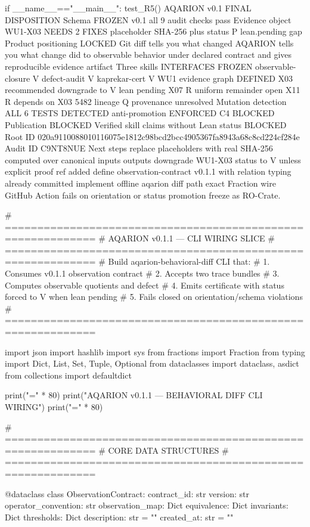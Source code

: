 if __name__=="__main__":
    test_R5()
AQARION v0.1 FINAL DISPOSITION
Schema FROZEN v0.1 all 9 audit checks pass
Evidence object WU1-X03 NEEDS 2 FIXES placeholder SHA-256 plus status P lean.pending gap
Product positioning LOCKED Git diff tells you what changed AQARION tells you what change did to observable behavior under declared contract and gives reproducible evidence artifact
Three skills INTERFACES FROZEN observable-closure V defect-audit V kaprekar-cert V
WU1 evidence graph DEFINED X03 recommended downgrade to V lean pending X07 R uniform remainder open X11 R depends on X03 5482 lineage Q provenance unresolved
Mutation detection ALL 6 TESTS DETECTED anti-promotion ENFORCED
C4 BLOCKED Publication BLOCKED Verified skill claims without Lean status BLOCKED
Root ID 020a9110088010116075e1812c98bcd2bcc4905367fa8943a68c8cd224cf284e Audit ID C9NT8NUE
Next steps replace placeholders with real SHA-256 computed over canonical inputs outputs downgrade WU1-X03 status to V unless explicit proof ref added define observation-contract v0.1.1 with relation typing already committed implement offline aqarion diff path exact Fraction wire GitHub Action fails on orientation or status promotion freeze as RO-Crate.

# ============================================================
# AQARION v0.1.1 — CLI WIRING SLICE
# ============================================================
# Build aqarion-behavioral-diff CLI that:
# 1. Consumes v0.1.1 observation contract
# 2. Accepts two trace bundles
# 3. Computes observable quotients and defect
# 4. Emits certificate with status forced to V when lean pending
# 5. Fails closed on orientation/schema violations
# ============================================================

import json
import hashlib
import sys
from fractions import Fraction
from typing import Dict, List, Set, Tuple, Optional
from dataclasses import dataclass, asdict
from collections import defaultdict

print("=" * 80)
print("AQARION v0.1.1 — BEHAVIORAL DIFF CLI WIRING")
print("=" * 80)

# ============================================================
# CORE DATA STRUCTURES
# ============================================================

@dataclass
class ObservationContract:
    contract_id: str
    version: str
    operator_convention: str
    observation_map: Dict
    equivalence: Dict
    invariants: Dict
    thresholds: Dict
    description: str = ""
    created_at: str = ""
    
